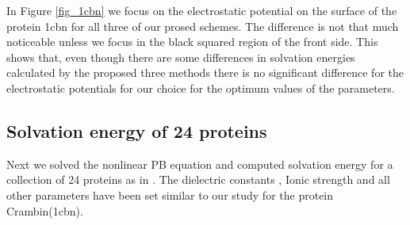In Figure \ref{fig_1cbn} we focus on the electrostatic potential on the surface of the protein 1cbn for all three of our prosed schemes.  The difference is not that much noticeable unless we focus in the black squared region of the front side. This shows that, even though there are some differences in solvation energies calculated by the proposed three methods there is no significant difference for the electrostatic potentials for our choice for the optimum values of the parameters.      



\subsection{Solvation energy of 24 proteins}
Next we solved the nonlinear PB equation and computed solvation energy for a collection of 24 proteins as in \cite{Geng2007,Geng2017a}. The dielectric constants , Ionic strength and all other parameters have been set similar to our study for the protein Crambin(1cbn).  
 

